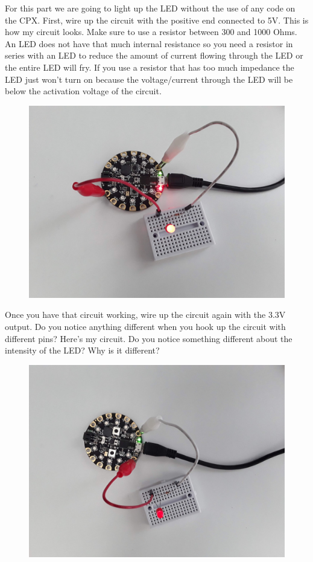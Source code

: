 For this part we are going to light up the LED without the use of any
code on the CPX. First, wire up the circuit with the positive end
connected to 5V. This is how my circuit looks. Make sure to use a
resistor between 300 and 1000 Ohms. An LED does not have that much
internal resistance so you need a resistor in series with an LED to
reduce the amount of current flowing through the LED or the entire LED
will fry. If you use a resistor that has too much impedance the LED
just won’t turn on because the voltage/current through the LED will be
below the activation voltage of the circuit. 
\begin{figure}[H]
  \begin{center}
    \includegraphics[width=\textwidth]{Figures/LED1.jpeg}
  \end{center}
\end{figure}
Once you have that circuit working, wire up the circuit again with the
3.3V output. Do you notice anything different when you hook up the
circuit with different pins? Here’s my circuit. Do you notice
something different about the intensity of the LED? Why is it
different?
\begin{figure}[H]
  \begin{center}
    \includegraphics[width=\textwidth]{Figures/LED2.jpeg}
  \end{center}
\end{figure}
